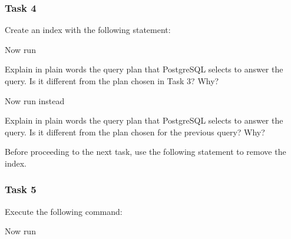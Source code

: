 \subsubsection{Task 4}

Create an index with the following statement:

\vgap

\noindent {}

\vgap

\noindent Now run

\vgap

\noindent {}

\vgap

\noindent Explain in plain words the query plan that PostgreSQL selects to answer the query. Is it different from the plan chosen in Task 3? Why?

\noindent Now run instead

\vgap

\noindent {}

\vgap

\noindent Explain in plain words the query plan that PostgreSQL selects to answer the query. Is it different from the plan chosen for the previous query? Why?


\vgap

\noindent Before proceeding to the next task, use the following statement to remove the index.

\vgap

\noindent {}

\subsubsection{Task 5}

Execute the following command:

\vgap

\noindent {}

\vgap

\noindent Now run

\vgap

\noindent {} \\
 \\
 \\

